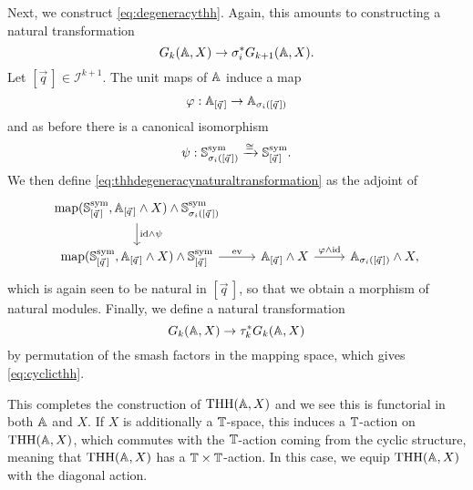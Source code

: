 Next, we construct \eqref{eq:degeneracythh}. Again, this
amounts to constructing a natural transformation
\begin{equation}\label{eq:thhdegeneracynaturaltransformation}
G_k(\mathbb{A},X)\to \sigma^\ast_i G_{k+1}(\mathbb{A},X).
\end{equation}
Let $[\vec{q}\,]\in \mathcal{I}^{k+1}$.
The unit maps of $\mathbb{A}$ induce a map
\[\varphi:\mathbb{A}_{[\vec{q}\,]}\to \mathbb{A}_{\sigma_i([\vec{q}\,])}
\]
and as before there is a canonical isomorphism
\[\psi:\mathbb{S}^{\mathrm{sym}}_{\sigma_i([\vec{q}\,])}\xrightarrow{\cong }
\mathbb{S}^{\mathrm{sym}}_{[\vec{q}\,]}.
\]
We then define \eqref{eq:thhdegeneracynaturaltransformation} as the adjoint of
\[
\begin{tikzcd}
 \map(\spherespectrum^{\mathrm{sym}}_{[\vec{q}\,]},\A_{[\vec{q}\,]}\wedge X) \wedge
\spherespectrum^{\mathrm{sym}}_{\sigma_i([\vec{q}\,])} 
\arrow{d}{\mathrm{id}\wedge \psi}\\
 \map(\spherespectrum^{\mathrm{sym}}_{[\vec{q}\,]},\A_{[\vec{q}\,]}\wedge X) \wedge
\spherespectrum^{\mathrm{sym}}_{[\vec{q}\,]}
\arrow{r}{\mathrm{ev}}
&\A_{[\vec{q}\,]}\wedge X
\arrow{r}{\varphi\wedge \mathrm{id}} 
&\A_{\sigma_i([\vec{q}\,])}\wedge X,
\end{tikzcd}
\]
which is again seen to be natural in $[\vec{q}\,]$, so that we obtain a
morphism of natural modules. Finally, we define a natural transformation
\[
G_k(\mathbb{A},X)\to \tau^\ast_k G_k(\mathbb{A},X)
\]
by permutation of the smash factors in the mapping space,
which gives \eqref{eq:cyclicthh}.

This completes the construction of $\mathrm{THH}(\mathbb{A}, X)$ and
we see this is functorial in both $\mathbb{A}$ and $X$. If $X$ is additionally
a $\mathbb{T}$-space, this  induces a $\mathbb{T}$-action on $\mathrm{THH}(\mathbb{A}, X)$,
which commutes with the $\mathbb{T}$-action coming
from the cyclic structure, meaning that $\mathrm{THH}(\mathbb{A}, X)$
has a $\mathbb{T}\times \mathbb{T}$-action. In this case, we equip
$\mathrm{THH}(\mathbb{A}, X)$ with the diagonal action.

